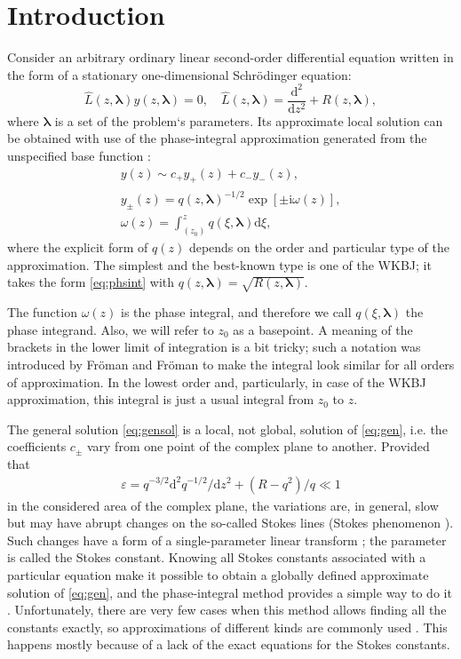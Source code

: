 \documentclass[atmp]{ipart_v1}
\def\LL{\widehat{L}}
\def\rmd{\mathrm{d}}
\def\rmi{\mathrm{i}}
\def\lmbd{\bm{\lambda}}
\def\w{\omega}
\newcommand\eref[1]{\eqref{#1}}
\newcommand\phsintgrnd[1][z]{q(#1,\lmbd)}
\newcommand\predexp[1][z]{q(#1,\lmbd)^{-1/2}}
\newcommand\phsintgrl[3][z]{\int_{#2}^{#3} \phsintgrnd[#1] \rmd #1}
\begin{document}
\section{Introduction \label{sec:intro}}
Consider an arbitrary ordinary linear second-order differential equation 
written in the form of a stationary one-dimensional Schr\"odinger equation:
\begin{equation}
\LL(z,\lmbd)y(z,\lmbd)=0, \quad \LL(z,\lmbd)=\frac{\rmd^2}{\rmd z^2} + R(z,\lmbd),   \label{eq:gen}
\end{equation}
where $\lmbd$ is a set of the problem`s parameters. Its approximate local solution can be
obtained with use of the phase-integral approximation generated 
from the unspecified base function \cite{frbook}:
\begin{subequations}
\label{eq:phsint}
\begin{eqnarray}
y(z) \sim c_+y_+(z) + c_-y_-(z), \label{eq:gensol}
\\
y_\pm(z) = \predexp \exp [\pm \rmi \w(z)], \label{eq:phbase}
\\
\w(z)=\phsintgrl[\xi]{(z_0)}{z}, \label{eq:phase}
\end{eqnarray}
\end{subequations}
where the explicit form of $q(z)$ depends on the order and particular type of the approximation.
The simplest and the best-known type is one of the WKBJ\cite{wkb1,wkb2,wkb3,wkbj}; 
it takes the form \eref{eq:phsint} with $\phsintgrnd = \sqrt{R(z,\lmbd)}$. 

The function $\w(z)$ is the phase integral, and therefore we call $\phsintgrnd[\xi]$ 
the phase integrand. Also, we will refer to $z_0$ as a basepoint.
A meaning of the brackets in the lower limit of integration is 
a bit tricky; such a notation was introduced by Fr\"oman and Fr\"oman \cite{frpaper} 
to make the integral look similar for all orders of approximation. In the lowest order and, 
particularly, in case of the WKBJ approximation, this integral is just a usual integral from $z_0$ to $z$.

The general solution \eref{eq:gensol} is a local, not global, solution of \eref{eq:gen}, i.e.
the coefficients $c_\pm$ vary from one point of the complex plane to another. Provided
that
\begin{eqnarray}
\varepsilon = q^{-3/2} \rmd^2 q^{-1/2}/\rmd z^2  + (R - q^2)/q \ll 1   \label{eq:cond}
\end{eqnarray}
in the considered area of the complex plane, the variations are, in general, slow
but may have abrupt changes on the so-called Stokes lines 
(Stokes phenomenon \cite{stokes,rwbook,heading,frbook}). Such 
changes have a form of a single-parameter linear transform \cite{heading}; 
the parameter is called the Stokes constant. 
Knowing all Stokes constants associated with a particular 
equation make it possible to obtain a globally defined approximate solution 
of \eref{eq:gen}, and the phase-integral method provides a simple 
way to do it \cite{heading,rwbook}. Unfortunately, there are very few 
cases when this method allows finding all the constants exactly, so approximations of different 
kinds are commonly used \cite{rwbook,ours}. This happens mostly because of a lack of the exact 
equations for the Stokes constants.
\end{document}
